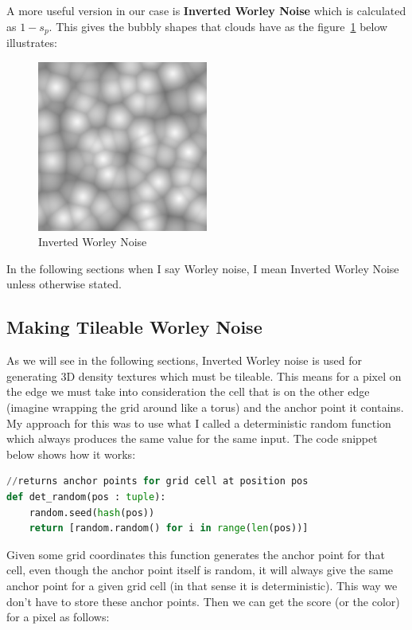 A more useful version in our case is \textbf{Inverted Worley Noise} which is calculated as $1 - s_p$. This gives the bubbly shapes that clouds have as the figure~\ref{fig:inverted_worley} below illustrates:
\begin{figure}[H]
    \centering
    \includegraphics[width=0.5\textwidth]{images/inverted_worley.png}
    \caption{Inverted Worley Noise}
    \label{fig:inverted_worley}
\end{figure}

In the following sections when I say Worley noise, I mean Inverted Worley Noise unless otherwise stated.

\subsection{Making Tileable Worley Noise}
As we will see in the following sections, Inverted Worley noise is used for generating 3D density textures which must be tileable. This means for a pixel on the edge we must take into consideration the cell that is on the other edge (imagine wrapping the grid around like a torus) and the anchor point it contains. My approach for this was to use what I called a deterministic random function which always produces the same value for the same input. The code snippet below shows how it works:
\begin{lstlisting}[language=Python]
//returns anchor points for grid cell at position pos
def det_random(pos : tuple):
	random.seed(hash(pos))
	return [random.random() for i in range(len(pos))]
\end{lstlisting}

Given some grid coordinates this function generates the anchor point for that cell, even though the anchor point itself is random, it will always give the same anchor point for a given grid cell (in that sense it is deterministic). This way we don't have to store these anchor points. Then we can get the score (or the color) for a pixel as follows:

